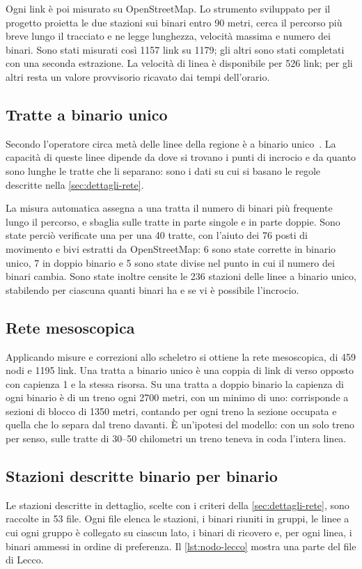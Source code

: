 Ogni link è poi misurato su OpenStreetMap. Lo strumento sviluppato per il progetto proietta le due stazioni sui binari entro 90 metri, cerca il percorso più breve lungo il tracciato e ne legge lunghezza, velocità massima e numero dei binari. Sono stati misurati così 1157 link su 1179; gli altri sono stati completati con una seconda estrazione. La velocità di linea è disponibile per 526 link; per gli altri resta un valore provvisorio ricavato dai tempi dell'orario.

\subsection{Tratte a binario unico}
\label{sec:dati-binario-unico}
Secondo l'operatore circa metà delle linee della regione è a binario unico~\cite{trenord2026bilancio}. La capacità di queste linee dipende da dove si trovano i punti di incrocio e da quanto sono lunghe le tratte che li separano: sono i dati su cui si basano le regole descritte nella \cref{sec:dettagli-rete}.

La misura automatica assegna a una tratta il numero di binari più frequente lungo il percorso, e sbaglia sulle tratte in parte singole e in parte doppie. Sono state perciò verificate una per una 40 tratte, con l'aiuto dei 76 posti di movimento e bivi estratti da OpenStreetMap: 6 sono state corrette in binario unico, 7 in doppio binario e 5 sono state divise nel punto in cui il numero dei binari cambia. Sono state inoltre censite le 236 stazioni delle linee a binario unico, stabilendo per ciascuna quanti binari ha e se vi è possibile l'incrocio.

\subsection{Rete mesoscopica}
Applicando misure e correzioni allo scheletro si ottiene la rete mesoscopica, di 459 nodi e 1195 link. Una tratta a binario unico è una coppia di link di verso opposto con capienza 1 e la stessa risorsa. Su una tratta a doppio binario la capienza di ogni binario è di un treno ogni 2700 metri, con un minimo di uno: corrisponde a sezioni di blocco di 1350 metri, contando per ogni treno la sezione occupata e quella che lo separa dal treno davanti. È un'ipotesi del modello: con un solo treno per senso, sulle tratte di 30--50 chilometri un treno teneva in coda l'intera linea.

\subsection{Stazioni descritte binario per binario}
Le stazioni descritte in dettaglio, scelte con i criteri della \cref{sec:dettagli-rete}, sono raccolte in 53 file. Ogni file elenca le stazioni, i binari riuniti in gruppi, le linee a cui ogni gruppo è collegato su ciascun lato, i binari di ricovero e, per ogni linea, i binari ammessi in ordine di preferenza. Il \cref{lst:nodo-lecco} mostra una parte del file di Lecco.

